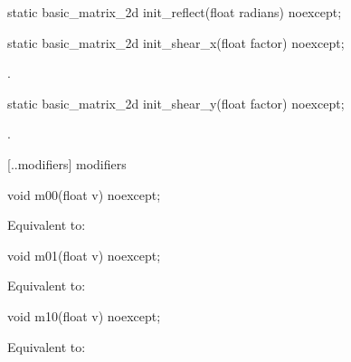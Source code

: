 %
\begin{itemdecl}
static basic_matrix_2d init_reflect(float radians) noexcept;
\end{itemdecl}
\begin{itemdescr}
\pnum
\returns
{}
\end{itemdescr}

%
\begin{itemdecl}
static basic_matrix_2d init_shear_x(float factor) noexcept;
\end{itemdecl}
\begin{itemdescr}
\pnum
\returns
{}.
\end{itemdescr}

%
\begin{itemdecl}
static basic_matrix_2d init_shear_y(float factor) noexcept;
\end{itemdecl}
\begin{itemdescr}
\pnum
\returns
{}.
\end{itemdescr}

 [\iotwod.\matrixtwod.modifiers] { modifiers}

%
\begin{itemdecl}
void m00(float v) noexcept;
\end{itemdecl}
\begin{itemdescr}
\pnum
\effects
Equivalent to: 
\end{itemdescr}

%
\begin{itemdecl}
void m01(float v) noexcept;
\end{itemdecl}
\begin{itemdescr}
\pnum
\effects
Equivalent to: 
\end{itemdescr}

%
\begin{itemdecl}
void m10(float v) noexcept;
\end{itemdecl}
\begin{itemdescr}
\pnum
\effects
Equivalent to: 
\end{itemdescr}

